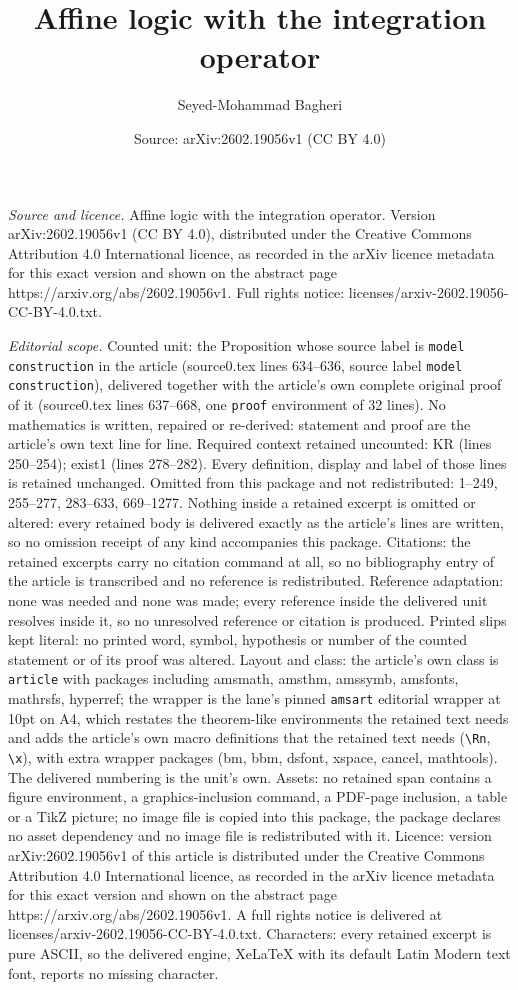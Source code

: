 \documentclass[10pt,a4paper]{amsart}
\title[Affine logic with the integration operator]{Affine logic with the integration operator}
\author{Seyed-Mohammad Bagheri}
\date{Source: arXiv:2602.19056v1 (CC BY 4.0)}
\begin{document}
\maketitle

\noindent\emph{Source and licence.} Affine logic with the integration operator. Version arXiv:2602.19056v1 (CC BY 4.0), distributed under the Creative Commons Attribution 4.0 International licence, as recorded in the arXiv licence metadata for this exact version and shown on the abstract page https://arxiv.org/abs/2602.19056v1. Full rights notice: licenses/arxiv-2602.19056-CC-BY-4.0.txt.\par\smallskip

\noindent\textit{Editorial scope.} Counted unit: the Proposition whose source label is \texttt{model construction} in the article (source0.tex lines 634--636, source label \texttt{model construction}), delivered together with the article's own complete original proof of it (source0.tex lines 637--668, one \texttt{proof} environment of 32 lines). No mathematics is written, repaired or re-derived: statement and proof are the article's own text line for line. Required context retained uncounted: KR (lines 250--254); exist1 (lines 278--282). Every definition, display and label of those lines is retained unchanged. Omitted from this package and not redistributed: 1--249, 255--277, 283--633, 669--1277. Nothing inside a retained excerpt is omitted or altered: every retained body is delivered exactly as the article's lines are written, so no omission receipt of any kind accompanies this package. Citations: the retained excerpts carry no citation command at all, so no bibliography entry of the article is transcribed and no reference is redistributed. Reference adaptation: none was needed and none was made; every reference inside the delivered unit resolves inside it, so no unresolved reference or citation is produced. Printed slips kept literal: no printed word, symbol, hypothesis or number of the counted statement or of its proof was altered. Layout and class: the article's own class is \texttt{article} with packages including amsmath, amsthm, amssymb, amsfonts, mathrsfs, hyperref; the wrapper is the lane's pinned \texttt{amsart} editorial wrapper at 10pt on A4, which restates the theorem-like environments the retained text needs and adds the article's own macro definitions that the retained text needs (\texttt{\textbackslash Rn}, \texttt{\textbackslash x}), with extra wrapper packages (bm, bbm, dsfont, xspace, cancel, mathtools). The delivered numbering is the unit's own. Assets: no retained span contains a figure environment, a graphics-inclusion command, a PDF-page inclusion, a table or a TikZ picture; no image file is copied into this package, the package declares no asset dependency and no image file is redistributed with it. Licence: version arXiv:2602.19056v1 of this article is distributed under the Creative Commons Attribution 4.0 International licence, as recorded in the arXiv licence metadata for this exact version and shown on the abstract page https://arxiv.org/abs/2602.19056v1. A full rights notice is delivered at licenses/arxiv-2602.19056-CC-BY-4.0.txt. Characters: every retained excerpt is pure ASCII, so the delivered engine, XeLaTeX with its default Latin Modern text font, reports no missing character.
\end{document}
